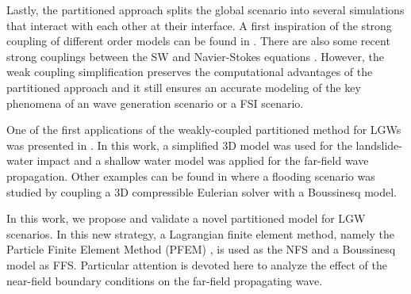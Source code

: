 Lastly, the partitioned approach splits the global scenario into several simulations that interact with each other at their interface. A first inspiration of the strong coupling of different order models can be found in \cite{formaggia2001}. There are also some recent strong couplings between the SW and Navier-Stokes equations \cite{pringle2016}. However, the weak coupling simplification preserves the computational advantages of the partitioned approach and it still ensures an accurate modeling of the key phenomena of an wave generation scenario or a FSI scenario.

One of the first applications of the weakly-coupled partitioned method for LGWs was presented in \cite{heinrich1998simulation}. In this work, a simplified 3D model was used for the landslide-water impact and a shallow water model was applied for the far-field wave propagation. Other examples can be found in \cite{lovholt2008oceanic} where a flooding scenario was studied by coupling a 3D compressible Eulerian solver with a Boussinesq model.

In this work, we propose and validate a novel partitioned model for LGW scenarios. In this new strategy, a Lagrangian finite element method, namely the Particle Finite Element Method (PFEM) \cite{idelsohn2004, onate2004, cremonesi2020state}, is used as the NFS and a Boussinesq model as FFS. Particular attention is devoted here to analyze the effect of the near-field boundary conditions on the far-field propagating wave.


